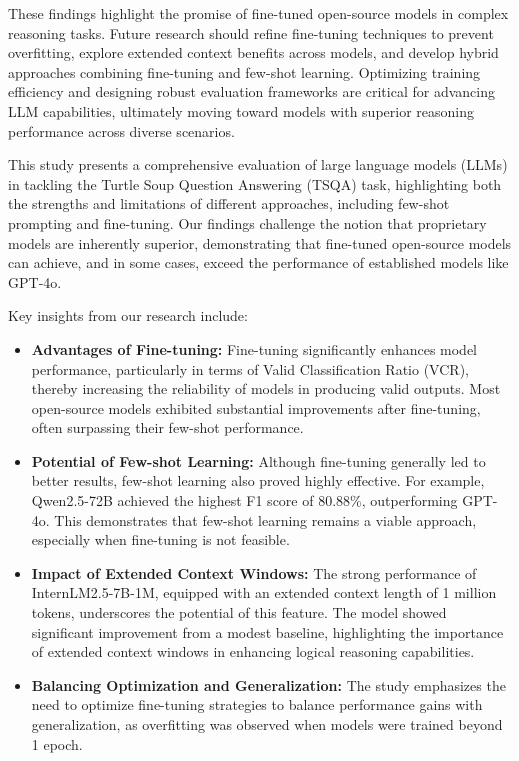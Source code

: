 \documentclass[conference]{IEEEtran}
\begin{document}
These findings highlight the promise of fine-tuned open-source models in complex reasoning tasks. Future research should refine fine-tuning techniques to prevent overfitting, explore extended context benefits across models, and develop hybrid approaches combining fine-tuning and few-shot learning. Optimizing training efficiency and designing robust evaluation frameworks are critical for advancing LLM capabilities, ultimately moving toward models with superior reasoning performance across diverse scenarios.

\iffalse
This study presents a comprehensive evaluation of large language models (LLMs) in tackling the Turtle Soup Question Answering (TSQA) task, highlighting both the strengths and limitations of different approaches, including few-shot prompting and fine-tuning. Our findings challenge the notion that proprietary models are inherently superior, demonstrating that fine-tuned open-source models can achieve, and in some cases, exceed the performance of established models like GPT-4o.

Key insights from our research include:

\begin{itemize}
    \item \textbf{Advantages of Fine-tuning:} Fine-tuning significantly enhances model performance, particularly in terms of Valid Classification Ratio (VCR), thereby increasing the reliability of models in producing valid outputs. Most open-source models exhibited substantial improvements after fine-tuning, often surpassing their few-shot performance.
    
    \item \textbf{Potential of Few-shot Learning:} Although fine-tuning generally led to better results, few-shot learning also proved highly effective. For example, Qwen2.5-72B achieved the highest F1 score of 80.88\%, outperforming GPT-4o. This demonstrates that few-shot learning remains a viable approach, especially when fine-tuning is not feasible.
    
    \item \textbf{Impact of Extended Context Windows:} The strong performance of InternLM2.5-7B-1M, equipped with an extended context length of 1 million tokens, underscores the potential of this feature. The model showed significant improvement from a modest baseline, highlighting the importance of extended context windows in enhancing logical reasoning capabilities.
    
    \item \textbf{Balancing Optimization and Generalization:} The study emphasizes the need to optimize fine-tuning strategies to balance performance gains with generalization, as overfitting was observed when models were trained beyond 1 epoch.
\end{itemize}
\end{document}
